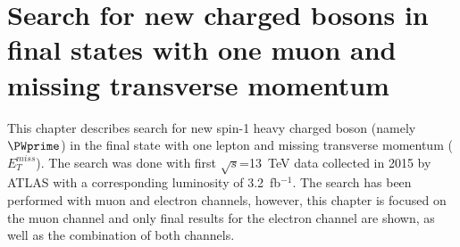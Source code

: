 \chapter{Search for new charged bosons in final states with one muon and missing transverse momentum}
\label{chap:Wprime}



This chapter describes search for new spin-1 heavy charged boson (namely $\PWprime$) in the final state with one lepton and missing transverse momentum ($E_T^{miss}$).
The search was done with first $\sqrt{s}$=13~TeV data collected in 2015 by ATLAS with a corresponding luminosity of 3.2~fb$^{-1}$. The search has been performed with muon and electron channels, however, this chapter is focused on the muon channel and only final results for the electron channel are shown, as well as the combination of both channels.



% 
% 
% 
% 


